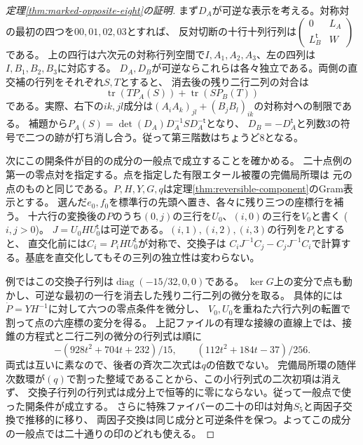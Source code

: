 \begin{proof}[定理\ref{thm:marked-opposite-eight}の証明]
まず$D_A$が可逆な表示を考える。対称対の最初の四つを$00,01,02,03$とすれば、
反対切断の十行十列行列は$\left(\begin{smallmatrix}0&L_A\\L_B^{\mathsf t}&W\end{smallmatrix}\right)$である。
上の四行は六次元の対称行列空間で$I,A_1,A_2,A_3$、左の四列は$I,B_1,B_2,B_3$に対応する。
$D_A,D_B$が可逆ならこれらは各々独立である。両側の直交補の行列をそれぞれ$S,T$とすると、
消去後の残り二行二列の対合は
\[
 \operatorname{tr}(T P_A(S))+\operatorname{tr}(S P_B(T))
\]
である。実際、右下の$ik,jl$成分は$(A_iA_k)_{jl}+(B_jB_l)_{ik}$の対称対への制限である。
補題から$P_A(S)=\det(D_A)D_A^{-1} S D_A^{-\mathsf t}$となり、
$D_B=-D_A^{\mathsf t}$と列数3の符号で二つの跡が打ち消し合う。従って第三階数はちょうど8となる。

次にこの開条件が目的の成分の一般点で成立することを確かめる。
二十点例の第一の零点対を指定する。点を指定した有限エタール被覆の完備局所環は
元の点のものと同じである。$P,H,Y,G,q$は定理\ref{thm:reversible-component}のGram表示とする。
選んだ$e_0,f_0$を標準行の先頭へ置き、各々に残り三つの座標行を補う。
十六行の変換後の$P$のうち$(0,j)$の三行を$U_0$、$(i,0)$の三行を$V_0$と書く ($i,j>0$)。
$J=U_0 H U_0^{\mathsf t}$は可逆である。$(i,1),(i,2),(i,3)$の行列を$P_i$とすると、
直交化前には$C_i=P_i H U_0^{\mathsf t}$が対称で、交換子は
$C_iJ^{-1}C_j-C_jJ^{-1}C_i$で計算する。基底を直交化してもその三列の独立性は変わらない。

例ではこの交換子行列は$\operatorname{diag}(-15/32,0,0)$である。
$\ker G$上の変分で点も動かし、可逆な最初の一行を消去した残り二行二列の微分を取る。
具体的には$\dot P=YH^{-1}$に対して六つの零点条件を微分し、
$V_0,U_0$を重ねた六行六列の転置で割って点の六座標の変分を得る。
上記ファイルの有理な接線の直線上では、接錐の方程式と二行二列の微分の行列式は順に
\[
 -(928t^2+704t+232)/15,\qquad (112t^2+184t-37)/256 .
\]
両式は互いに素なので、後者の斉次二次式は$q$の倍数でない。
完備局所環の随伴次数環が$(q)$で割った整域であることから、この小行列式の二次初項は消えず、
交換子行列の行列式は成分上で恒等的に零にならない。従って一般点で使った開条件が成立する。
さらに特殊ファイバーの二十の印は対角$S_5$と両因子交換で推移的に移り、
両因子交換は同じ成分と可逆条件を保つ。よってこの成分の一般点では二十通りの印のどれも使える。
\end{proof}

